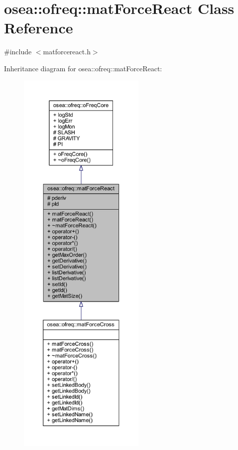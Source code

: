 \hypertarget{classosea_1_1ofreq_1_1mat_force_react}{\section{osea\-:\-:ofreq\-:\-:mat\-Force\-React Class Reference}
\label{classosea_1_1ofreq_1_1mat_force_react}
}


{\ttfamily \#include $<$matforcereact.\-h$>$}



Inheritance diagram for osea\-:\-:ofreq\-:\-:mat\-Force\-React\-:
\nopagebreak
\begin{figure}[H]
\begin{center}
\leavevmode
\includegraphics[height=550pt]{classosea_1_1ofreq_1_1mat_force_react__inherit__graph}
\end{center}
\end{figure}

